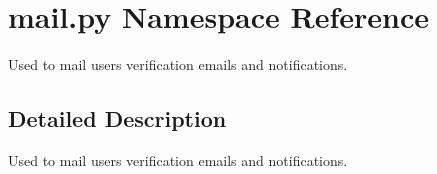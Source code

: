 \hypertarget{namespacemail_1_1py}{}\section{mail.\+py Namespace Reference}
\label{namespacemail_1_1py}


Used to mail users verification emails and notifications.  




\subsection{Detailed Description}
Used to mail users verification emails and notifications. 